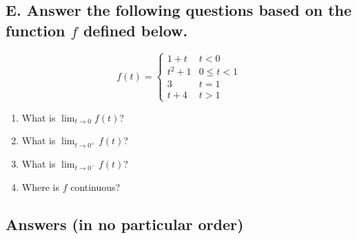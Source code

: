 \documentclass{article}
\begin{document}
\subsection*{E. Answer the following questions based on the function $f$ defined below.}
\begin{multicols}{2}
$$f(t)=\begin{cases}
1+t & t<0 \\
t^2+1 & 0 \leq t<1 \\ 
3 & t=1 \\
t+4 & t>1
\end{cases}$$
\columnbreak
\begin{enumerate}
\item What is $\displaystyle\lim_{t\to 0}f(t)$?
\item What is $\displaystyle\lim_{t\to 0^+}f(t)$?
\item What is $\displaystyle\lim_{t\to 0^-}f(t)$?
\item Where is $f$ continuous?
\end{enumerate}
\end{multicols}


\newpage

\subsection*{Answers (in no particular order)}
\end{document}
